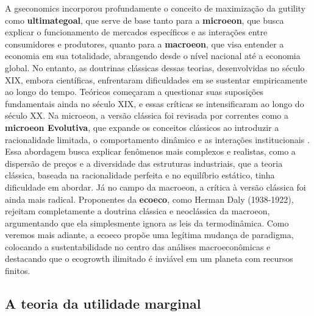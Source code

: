 \documentclass[./main.tex]{subfiles}
\begin{document}
\par A \gls{gseconomics} incorporou profundamente o conceito de maximização da \gls{gutility} como \textbf{\gls{ultimategoal}}, que serve de base tanto para a \textbf{\gls{microeon}}, que busca explicar o funcionamento de mercados específicos e as interações entre consumidores e produtores, quanto para a \textbf{\gls{macroeon}}, que visa entender a economia em sua totalidade, abrangendo desde o nível nacional até a economia global. No entanto, as doutrinas clássicas dessas teorias, desenvolvidas no século XIX, embora científicas, enfrentaram dificuldades em se sustentar empiricamente ao longo do tempo. Teóricos começaram a questionar suas suposições fundamentais ainda no século XIX, e essas críticas se intensificaram ao longo do século XX. Na \gls{microeon}, a versão clássica foi revisada por correntes como a \textbf{\gls{microeon} Evolutiva}, que expande os conceitos clássicos ao introduzir a racionalidade limitada, o comportamento dinâmico e as interações institucionais \cite{Nelson1985a, Bourgine2006a}. Essa abordagem busca explicar fenômenos mais complexos e realistas, como a dispersão de preços e a diversidade das estruturas industriais, que a \gls{teoria} clássica, baseada na racionalidade perfeita e no equilíbrio estático, tinha dificuldade em abordar. Já no campo da \gls{macroeon}, a crítica à versão clássica foi ainda mais radical. Proponentes da \textbf{\gls{ecoeco}}, como Herman Daly (1938-1922), rejeitam completamente a doutrina clássica e neoclássica da \gls{macroeon}, argumentando que ela simplesmente ignora as leis da termodinâmica. Como veremos mais adiante, a \gls{ecoeco} propõe uma legítima mudança de \gls{paradigma}, colocando a sustentabilidade no centro das análises macroeconômicas e destacando que o \gls{ecogrowth} ilimitado é inviável em um planeta com recursos finitos.

\subsection{A teoria da utilidade marginal} \label{subsec:marginutil}
\end{document}
